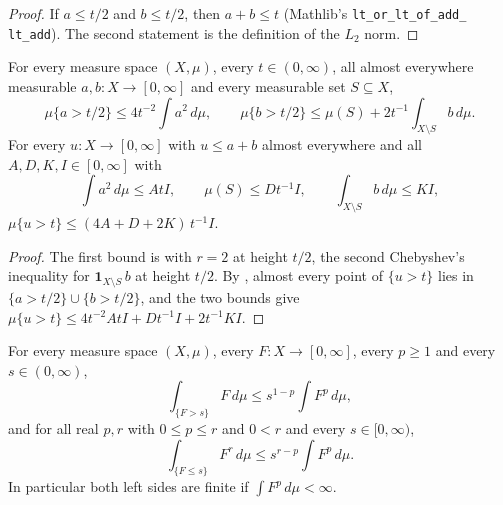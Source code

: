 \begin{proof}
\leanok
If $a \leq t/2$ and $b \leq t/2$, then $a + b \leq t$ (Mathlib's
\texttt{lt\_\allowbreak or\_\allowbreak lt\_\allowbreak of\_\allowbreak add\_\allowbreak
lt\_\allowbreak add}). The second statement is the definition of the $L_2$ norm.
\end{proof}

\begin{lemma}
\label{lem:level-sets-split-function}
\leanok
{}
For every measure space $(X, \mu)$, every $t \in (0, \infty)$, all almost everywhere measurable
$a, b : X \to [0, \infty]$ and every measurable set $S \subseteq X$,
\[
  \mu\{a > t/2\} \leq 4 t^{-2} \int a^2 \, d\mu , \qquad
  \mu\{b > t/2\} \leq \mu(S) + 2 t^{-1} \int_{X \setminus S} b \, d\mu .
\]
For every $u : X \to [0, \infty]$ with $u \leq a + b$ almost everywhere and all
$A, D, K, I \in [0, \infty]$ with
\[
  \int a^2 \, d\mu \leq A t I , \qquad \mu(S) \leq D t^{-1} I , \qquad
  \int_{X \setminus S} b \, d\mu \leq K I ,
\]
$\mu\{u > t\} \leq (4A + D + 2K) \, t^{-1} I$.
\end{lemma}

\begin{proof}
\leanok
{}
The first bound is  with $r = 2$ at height $t/2$, the second
Chebyshev's inequality for $\mathbf 1_{X \setminus S} \, b$ at height $t/2$. By
, almost every point of $\{u > t\}$ lies in
$\{a > t/2\} \cup \{b > t/2\}$, and the two bounds give
$\mu\{u > t\} \leq 4 t^{-2} A t I + D t^{-1} I + 2 t^{-1} K I$.
\end{proof}

\begin{lemma}
\label{lem:parts-above-below-level}
\leanok
For every measure space $(X, \mu)$, every $F : X \to [0, \infty]$, every $p \geq 1$ and every
$s \in (0, \infty)$,
\[
  \int_{\{F > s\}} F \, d\mu \leq s^{1-p} \int F^p \, d\mu ,
\]
and for all real $p, r$ with $0 \leq p \leq r$ and $0 < r$ and every $s \in [0, \infty)$,
\[
  \int_{\{F \leq s\}} F^r \, d\mu \leq s^{r-p} \int F^p \, d\mu .
\]
In particular both left sides are finite if $\int F^p \, d\mu < \infty$.
\end{lemma}

